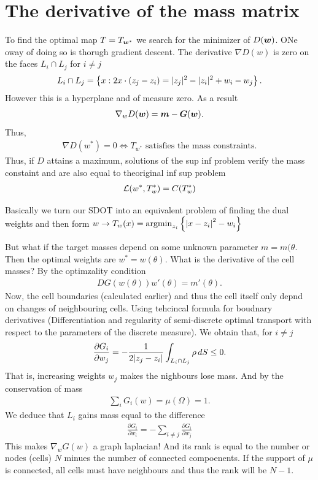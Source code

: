 \documentclass[
    a4paper,
    DIV=13,
    abstract=true,
    numbers=noenddot
]{scrartcl}
\begin{document}
\section{The derivative of the mass matrix}
To find the optimal map $T=T_{{\bm{w}}^*}$ we search for the minimizer of $D({\bm{w}})$. ONe oway of doing so is thorugh gradient descent. The derivative $\nabla D(w)$ is zero on the faces $L_i \cap L_j$ for $i \neq j$
\begin{align*}
    L_i \cap L_j =\left\{x:2x\cdot(z_j-z_i)=|z_j|^2-|z_i|^2+w_i-w_j\right\}.
\end{align*}
However this is a hyperplane and of measure zero. As a result
\begin{align*}
     \nabla_{w}D({\bm{w}})= {\bm{m}}- {\bm{G}}({\bm{w}}).
\end{align*}
Thus, 
\begin{align*}
\nabla D(w^*)=0 \iff T_{w^*}\text{ satisfies the mass constraints}.
\end{align*}
Thus, if $D$ attains a maximum, solutions of the sup inf problem verify the mass constaint and are also equal to theoriginal inf sup problem
\begin{align*}
    \mathcal{L}(w^*,T_w^*)=C(T_w^*)
\end{align*}

Basically we turn our SDOT into an equivalent problem of finding the dual weights and then form $w \to T_w(x) = \mathrm{argmin}_{z_i} \left\{\left| x-z_i \right|^2- w_i\right\}$


But what if the target masses depend on some unknown parameter $m= m(\theta$. Then the optimal weights  are $w^*=w(\theta)$. What is the derivative of the cell masses? By the optimzality condition
\begin{align*}
    DG(w(\theta))w'(\theta)=m'(\theta).
\end{align*}
Now, the cell boundaries (calculated earlier) and thus the cell itself only depnd on changes of neighbouring cells.
Using tehcincal formula for boudnary derivatives (Differentiation and regularity of semi-discrete
optimal transport with respect to the parameters
of the discrete measure). We obtain that, for $i \neq j$
\begin{align*}
\frac{\partial G_i}{\partial w_j}=-\frac{1}{2|z_j-z_i|}\int_{L_i\cap L_j}\rho\thinspace dS\le0.
\end{align*}
That is, increasing weights $w_j$ makes the nighbours lose mass. And by the conservation of mass 
\begin{align*}
    \sum_{i}G_i(w)= \mu(\Omega)=1. 
\end{align*}
We deduce that $L_i$ gains mass equal to the difference
\begin{align*}
\frac{\partial G_i}{\partial w_i}= -\sum_{i \neq j}\frac{\partial G_i}{\partial w_j}\end{align*}
This makes $\nabla_wG(w)$ a graph laplacian! And its rank is equal to the number or nodes (cells) $N$ minues the number of connected compoenents. If the support of $\mu$ is connected, all cells must have neighbours and thus the rank will be $N-1$.
\end{document}
